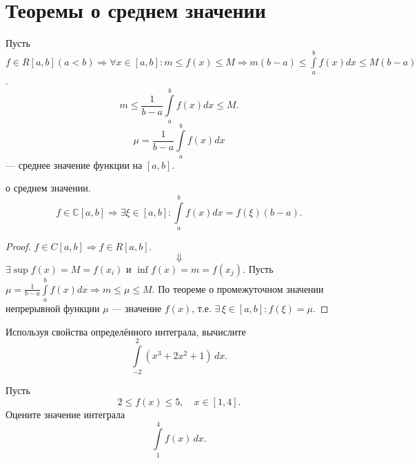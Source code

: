 \section{ Теоремы о среднем значении}

\begin{definition}
    Пусть $ f \in R[a,b] (a < b) \Rightarrow \forall x \in [a,b]: m \leqslant f(x) \leqslant M \Rightarrow m(b-a) \leqslant \int\limits_a^b f(x)dx \leqslant M(b-a)$.
    $$m  \leqslant \frac{1}{b-a} \int\limits_a^b f(x)dx \leqslant M.$$
    $$\mu = \frac{1}{b-a} \int\limits_a^bf(x)dx$$ — среднее значение функции на $[a,b]$.
\end{definition}

\begin{theorem}
    о среднем значении.
    $$f \in \mathbb{C}[a,b] \Rightarrow \exists \xi \in [a,b]: \int\limits_a^b f(x)dx = f(\xi)(b-a).$$
    \begin{proof}
        $ f \in C[a,b] \Rightarrow f \in R[a,b]$.
         $$\Downarrow$$
         $\exists \sup f(x) = M = f(x_i)$ и $\inf f(x) = m = f(x_j)$.
         Пусть $ \mu = \frac{1}{b-a} \int\limits_a^b f(x)dx \Rightarrow m \leqslant \mu \leqslant M$. По теореме о промежуточном значении непрерывной функции $\mu$ — значение $f(x)$, т.е. $\exists \, \xi \in [a,b]: f(\xi) = \mu$.
    \end{proof}
\end{theorem}


\begin{task}
Используя свойства определённого интеграла, вычислите 
$$ \int\limits_{-2}^{2} (x^3+2x^2+1)\,dx.$$
\end{task}

\begin{task}
Пусть
$$ 2\leqslant f(x)\leqslant 5,\quad x\in[1,4]. $$
Оцените значение интеграла 
$$ \int\limits_1^4 f(x)\,dx. $$
\end{task}
